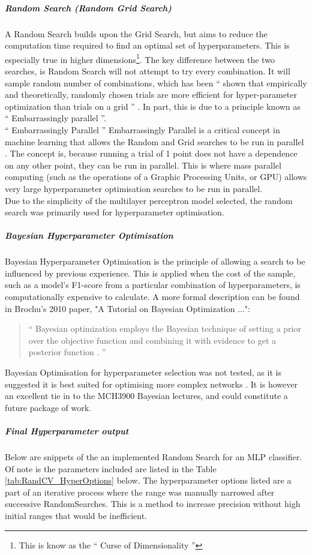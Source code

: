 \documentclass{UoNMCHA}
\newcommand{\inlineQuote}[1]{`` #1 ''}
\newcommand{\fancyquote}[1]{\begin{quotation}\inlineQuote{#1}\end{quotation}}
\newcommand{\tref}[1] {Table \ref{#1}}
\numberwithin{equation}{section}
\begin{document}
\subparagraph{Random Search (Random Grid Search)}
A Random Search builds upon the Grid Search, but aims to reduce the computation time required to find an optimal set of hyperparameters. This is especially true in higher dimensions\footnote{This is know as the \inlineQuote{Curse of Dimensionality}}. The key difference between the two searches, is Random Search will not attempt to try every combination. It will sample random number of combinations, which has been \inlineQuote{shown that empirically and theoretically, randomly chosen trials are more efficient for hyper-parameter optimization than trials on a grid} \cite{bergstra2012random}. In part, this is due to a principle known as \inlineQuote{Embarrassingly parallel}.
\\
\inlineQuote{Embarrassingly Parallel} 
Embarrassingly Parallel is a critical concept in machine learning that allows the Random and Grid searches to be run in parallel \cite{MauriceHerlihy2012}. The concept is, because running a trial of 1 point does not have a dependence on any other point, they can be run in parallel. This is where mass parallel computing (such as the operations of a Graphic Processing Units, or GPU) allows very large hyperparameter optimisation searches to be run in parallel. \\

Due to the simplicity of the multilayer perceptron model selected, the random search was primarily used for hyperparameter optimisation.

\subparagraph{Bayesian Hyperparameter Optimisation}
Bayesian Hyperparameter Optimisation is the principle of allowing a search to be influenced by previous experience. This is applied when the cost of the sample, such as a model's F1-score from a particular combination of hyperparameters, is computationally expensive to calculate. A more formal description can be found in Brochu's 2010 paper, "A Tutorial on Bayesian Optimization ...":

\fancyquote{Bayesian optimization employs the Bayesian technique of setting a prior over the objective function and combining it with evidence to get a posterior function \cite{Brochu2010}.}

Bayesian Optimisation for hyperparameter selection was not tested, as it is suggested it is best suited for optimising more complex networks \cite{Snoek2012} \cite{Brochu2010}. It is however an excellent tie in to the MCH3900 Bayesian lectures, and could constitute a future package of work.

\subparagraph{Final Hyperparameter output}
Below are snippets of the an implemented Random Search for an MLP classifier. Of note is the parameters included are listed in the \tref{tab:RandCV_HyperOptions} below. The hyperparameter options listed are a part of an iterative process where the range was manually narrowed after successive RandomSearches. This is a method to increase precision without high initial ranges that would be inefficient. 
\end{document}
